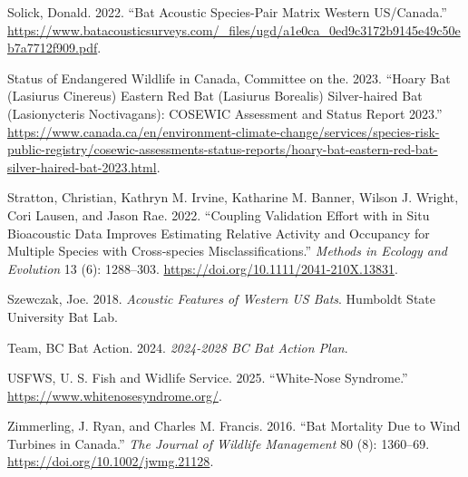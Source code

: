\documentclass[
  letterpaper,
  DIV=11,
  numbers=noendperiod]{scrartcl}
\newlength{\cslhangindent}
\newenvironment{CSLReferences}[2] %
 {\begin{list}{}{%
  \setlength{\itemindent}{0pt}
  \setlength{\leftmargin}{0pt}
  \setlength{\parsep}{0pt}
  \ifodd #1
   \setlength{\leftmargin}{\cslhangindent}
   \setlength{\itemindent}{-1\cslhangindent}
  \fi
  \setlength{\itemsep}{#2\baselineskip}}}
 {\end{list}}
\begin{document}
\begin{CSLReferences}{1}{1}
Solick, Donald. 2022. {``Bat {Acoustic Species-Pair Matrix Western
US}/{Canada}.''}
\url{https://www.batacousticsurveys.com/_files/ugd/a1e0ca_0ed9c3172b9145e49c50eb7a7712f909.pdf}.

Status of Endangered Wildlife in Canada, Committee on the. 2023.
{``Hoary {Bat} ({Lasiurus} Cinereus) {Eastern Red Bat} ({Lasiurus}
Borealis) {Silver-haired Bat} ({Lasionycteris} Noctivagans): {COSEWIC}
Assessment and Status Report 2023.''}
\url{https://www.canada.ca/en/environment-climate-change/services/species-risk-public-registry/cosewic-assessments-status-reports/hoary-bat-eastern-red-bat-silver-haired-bat-2023.html}.

Stratton, Christian, Kathryn M. Irvine, Katharine M. Banner, Wilson J.
Wright, Cori Lausen, and Jason Rae. 2022. {``Coupling Validation Effort
with in Situ Bioacoustic Data Improves Estimating Relative Activity and
Occupancy for Multiple Species with Cross‐species Misclassifications.''}
\emph{Methods in Ecology and Evolution} 13 (6): 1288--303.
\url{https://doi.org/10.1111/2041-210X.13831}.

Szewczak, Joe. 2018. \emph{Acoustic {Features} of {Western US Bats}}.
Humboldt State University Bat Lab.

Team, BC Bat Action. 2024. \emph{2024-2028 BC Bat Action Plan}.

USFWS, U. S. Fish and Widlife Service. 2025. {``White-{Nose
Syndrome}.''} \url{https://www.whitenosesyndrome.org/}.

Zimmerling, J. Ryan, and Charles M. Francis. 2016. {``Bat Mortality Due
to Wind Turbines in {Canada}.''} \emph{The Journal of Wildlife
Management} 80 (8): 1360--69. \url{https://doi.org/10.1002/jwmg.21128}.

\end{CSLReferences}
\end{document}
